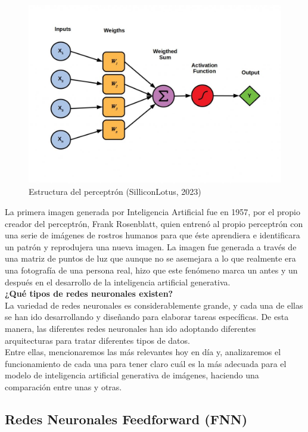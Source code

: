 \begin{figure}[h]
	\centering
	\includegraphics[width = 1 \textwidth]{Imagenes/Vectorial/Perceptrones.jpeg}
	\caption{Estructura del perceptrón (SilliconLotus, 2023)}
	\label{fig:perceptron}
\end{figure}

La primera imagen generada por Inteligencia Artificial fue en 1957, por el propio creador del perceptrón, Frank Rosenblatt, quien entrenó al propio perceptrón con una serie de imágenes de rostros humanos para que éste aprendiera e identificara un patrón y reprodujera una nueva imagen. La imagen fue generada a través de una matriz de puntos de luz que aunque no se asemejara a lo que realmente era una fotografía de una persona real, hizo que este fenómeno marca un antes y un después en el desarrollo de la inteligencia artificial generativa.\\

\textbf{¿Qué tipos de redes neuronales existen?}\\

La variedad de redes neuronales es considerablemente grande, y cada una de ellas se han ido desarrollando y diseñando para elaborar tareas específicas. De esta manera, las diferentes redes neuronales han ido adoptando diferentes arquitecturas para tratar diferentes tipos de datos.\\
Entre ellas, mencionaremos las más relevantes hoy en día y, analizaremos el funcionamiento de cada una para tener claro cuál es la más adecuada para el modelo de inteligencia artificial generativa de imágenes, haciendo una comparación entre unas y otras.

\subsection{Redes Neuronales Feedforward (FNN)}


